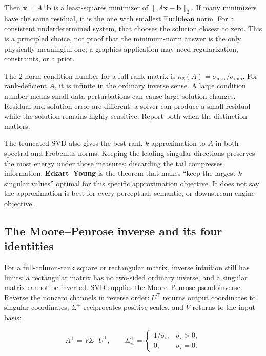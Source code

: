 Then \(\mathbf x=A^+\mathbf b\) is a least-squares minimizer of \(\|A\mathbf x-\mathbf b\|_2\). If many minimizers have the same residual, it is the one with smallest Euclidean norm. For a consistent underdetermined system, that chooses the solution closest to zero. This is a principled choice, not proof that the minimum-norm answer is the only physically meaningful one; a graphics application may need regularization, constraints, or a prior.

The 2-norm condition number for a full-rank matrix is \(\kappa_2(A)=\sigma_{\max}/\sigma_{\min}\). For rank-deficient \(A\), it is infinite in the ordinary inverse sense. A large condition number means small data perturbations can cause large solution changes. Residual and solution error are different: a solver can produce a small residual while the solution remains highly sensitive. Report both when the distinction matters.

The truncated SVD also gives the best rank-\(k\) approximation to \(A\) in both spectral and Frobenius norms. Keeping the leading singular directions preserves the most energy under those measures; discarding the tail compresses information. \textbf{Eckart--Young} is the theorem that makes ``keep the largest \(k\) singular values'' optimal for this specific approximation objective. It does not say the approximation is best for every perceptual, semantic, or downstream-engine objective.

\subsection{The Moore--Penrose inverse and its four identities}\label{02-foundations-ii-ch024-the-moorepenrose-inverse-and-its-four-identities}

\hypertarget{02-foundations-ii-ch024-the-moorepenrose-inverse-and-its-four-identities}{}

For a full-column-rank square or rectangular matrix, inverse intuition still has limits: a rectangular matrix has no two-sided ordinary inverse, and a singular matrix cannot be inverted. SVD supplies the \hyperref[02-foundations-ii-ch024-the-moorepenrose-inverse-and-its-four-identities]{Moore--Penrose pseudoinverse}. Reverse the nonzero channels in reverse order: \(U^\mathsf T\) returns output coordinates to singular coordinates, \(\Sigma^+\) reciprocates positive scales, and \(V\) returns to the input basis:

\[
A^+=V\Sigma^+U^\mathsf T,
\qquad
\Sigma^+_{ii}=\begin{cases}1/\sigma_i,&\sigma_i>0,\\0,&\sigma_i=0.\end{cases}
\]

